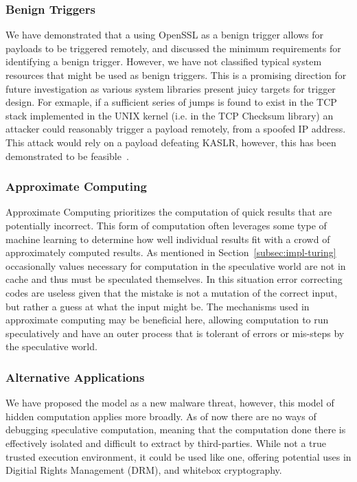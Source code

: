 \subsubsection{Benign Triggers}
We have demonstrated that a using \allowbreak OpenSSL as a benign trigger allows for
\speculake payloads to be triggered remotely, and discussed the minimum
requirements for identifying a benign trigger. However, we have not classified
typical system resources that might be used as benign triggers. This is a
promising direction for future investigation as various system libraries present
juicy targets for trigger design. For exmaple, if a sufficient series of jumps
is found to exist in the TCP stack implemented in the UNIX kernel (i.e. in the
TCP Checksum library) an attacker could reasonably trigger a \speculake payload
remotely, from a spoofed IP address. This attack would rely on a payload
defeating KASLR, however, this has been demonstrated to be
feasible~\cite{gruss2017kaslr,evtyushkin2016jump}.

\subsubsection{Approximate Computing}
Approximate Computing prioritizes the computation of quick results that are
potentially incorrect. This form of computation often leverages some type of
machine learning to determine how well individual results fit with a crowd of
approximately computed results. As mentioned in Section~\ref{subsec:impl-turing}
occasionally values necessary for computation in the speculative world are not
in cache and thus must be speculated themselves. In this situation error
correcting codes are useless given that the mistake is not a mutation of the
correct input, but rather a guess at what the input might be. The mechanisms
used in approximate computing may be beneficial here, allowing computation to
run speculatively and have an outer process that is tolerant of errors or
mis-steps by the speculative world.



\subsubsection{Alternative Applications}
We have proposed the \speculake model as a new malware threat, however, this
model of hidden computation applies more broadly. As of now there are no ways of
debugging speculative computation, meaning that the computation done there is
effectively isolated and difficult to extract by third-parties. While not a true
trusted execution environment, it could be used like one, offering potential
uses in Digitial Rights Management (DRM), and whitebox cryptography.



